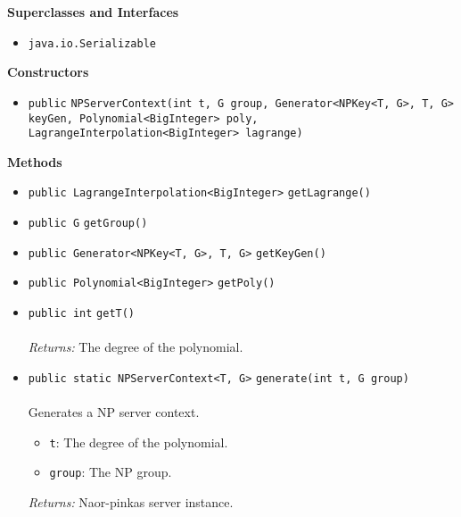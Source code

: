 \textbf{\sffamily Superclasses and Interfaces}
\begin{itemize}
\item \lstinline|java.io.Serializable|
\end{itemize}


\textbf{\sffamily Constructors}
\begin{itemize}
\item \lstinline|public| \lstinline|NPServerContext|\lstinline|(int t, G group, Generator<NPKey<T, G>, T, G> keyGen, Polynomial<BigInteger> poly, LagrangeInterpolation<BigInteger> lagrange)| \\[-0.6em]




\end{itemize}


\textbf{\sffamily Methods}
\begin{itemize}
\item \lstinline|public LagrangeInterpolation<BigInteger>| \lstinline|getLagrange|\lstinline|()| \\[-0.6em]




\item \lstinline|public G| \lstinline|getGroup|\lstinline|()| \\[-0.6em]




\item \lstinline|public Generator<NPKey<T, G>, T, G>| \lstinline|getKeyGen|\lstinline|()| \\[-0.6em]




\item \lstinline|public Polynomial<BigInteger>| \lstinline|getPoly|\lstinline|()| \\[-0.6em]




\item \lstinline|public int| \lstinline|getT|\lstinline|()|\\ \\[-0.6em]
\emph{Returns:} The degree of the polynomial.



\item \lstinline|public static NPServerContext<T, G>| \lstinline|generate|\lstinline|(int t, G group)|\\ \\[-0.6em]
Generates a NP server context.
\begin{itemize}
\item \lstinline|t|: The degree of the polynomial.
\item \lstinline|group|: The NP group.
\end{itemize}

\emph{Returns:} Naor-pinkas server instance.

\end{itemize}

